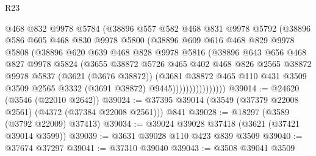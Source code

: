 \begin{lexlean}{R23}
\begin{coremodule}
                      @468
                      @832
                      @9978
                      @5784
                      (@38896
                        @557
                        @582
                        @468
                        @831
                        @9978
                        @5792
                        (@38896
                          @586
                          @605
                          @468
                          @830
                          @9978
                          @5800
                          (@38896
                            @609
                            @616
                            @468
                            @829
                            @9978
                            @5808
                            (@38896
                              @620
                              @639
                              @468
                              @828
                              @9978
                              @5816
                              (@38896
                                @643
                                @656
                                @468
                                @827
                                @9978
                                @5824
                                (@3655
                                  @38872
                                  @5726
                                  @465
                                  @402
                                  @468
                                  @826
                                  @2565
                                  @38872
                                  @9978
                                  @5837
                                  (@3621 (@3676 @38872))
                                  (@3681
                                    @38872
                                    @465
                                    @110
                                    @431
                                    @3509
                                    @3509
                                    @2565
                                    @3332
                                    (@3691 @38872)
                                    @9445))))))))))))))))
@39014 := @24620 (@3546 (@22010 @2642))
@39024 := @37395 @39014 (@3549 (@37379 @22008 @2561) (@4372 (@37384 @22008 @2561))) @841
@39028 := @18297 (@3589 (@3792 @22009) @37413)
@39034 := @39024 @39028 @37418 (@3621 (@37421 @39014 @3599))
@39039 := @3631 @39028 @110 @423 @839 @3509
@39040 := @37674 @37297
@39041 := @37310 @39040
@39043 := @3508 @39041 @3509

\end{coremodule}
\end{lexlean}
